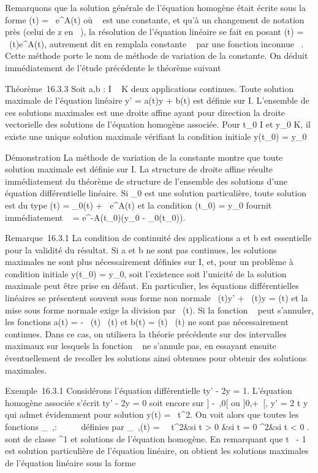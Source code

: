 \documentclass[]{article}
\begin{document}
Remarquons que la solution générale de l'équation homogène était écrite
sous la forme \phi(t) = \lambda~e^A(t) où \lambda~ est une constante, et qu'à
un changement de notation près (celui de z en \lambda~), la résolution de
l'équation linéaire se fait en posant \phi(t) = \lambda~(t)e^A(t),
autrement dit en rempla\ccant la constante \lambda~ par une
fonction inconnue \lambda~. Cette méthode porte le nom de méthode de variation
de la constante. On déduit immédiatement de l'étude précédente le
théorème suivant

Théorème~16.3.3 Soit a,b : I \rightarrow~ K deux applications continues. Toute
solution maximale de l'équation linéaire y' = a(t)y + b(t) est définie
sur I. L'ensemble de ces solutions maximales est une droite affine ayant
pour direction la droite vectorielle des solutions de l'équation
homogène associée. Pour t_0 \in I et y_0 \in K, il existe
une unique solution maximale vérifiant la condition initiale
y(t_0) = y_0

Démonstration La méthode de variation de la constante montre que toute
solution maximale est définie sur I. La structure de droite affine
résulte immédiatement du théorème de structure de l'ensemble des
solutions d'une équation différentielle linéaire. Si \phi_0 est
une solution particulière, toute solution est du type \phi(t) =
\phi_0(t) + \lambda~e^A(t) et la condition \phi(t_0) =
y_0 fournit immédiatement \lambda~ =
e^-A(t_0)(y_0 -
\phi_0(t_0)).

Remarque~16.3.1 La condition de continuité des applications a et b est
essentielle pour la validité du résultat. Si a et b ne sont pas
continues, les solutions maximales ne sont plus nécessairement définies
sur I, et, pour un problème à condition initiale y(t_0) =
y_0, soit l'existence soit l'unicité de la solution maximale
peut être prise en défaut. En particulier, les équations différentielles
linéaires se présentent souvent sous forme non normale \alpha~(t)y' + \beta~(t)y =
\gamma(t) et la mise sous forme normale exige la division par \alpha~(t). Si la
fonction \alpha~ peut s'annuler, les fonctions a(t) = - \beta~(t)
\over \alpha~(t) et b(t) = \gamma(t) \over \alpha~(t)
ne sont pas nécessairement continues. Dans ce cas, on utilisera la
théorie précédente sur des intervalles maximaux sur lesquels la fonction
\alpha~ ne s'annule pas, en essayant ensuite éventuellement de recoller les
solutions ainsi obtenues pour obtenir des solutions maximales.

Exemple~16.3.1 Considérons l'équation différentielle ty' - 2y = 1.
L'équation homogène associée s'écrit ty' - 2y = 0 soit encore sur {]}
-\infty~,0{[} ou {]}0,+\infty~{[}, y' = 2 \over t y qui admet
évidemment pour solution y(t) = \lambda~t^2. On voit alors que
toutes les fonctions \phi_\lambda~,\mu : ~ \rightarrow~ ~ définies par
\phi_\lambda~,\mu(t) = \left \
\cases \lambda~t^2&si t \textgreater{} 0
 &si t = 0 \cr \mut^2&si t
\textless{} 0  \right . sont de classe ^1
et solutions de l'équation homogène. En remarquant que
t\mapsto~ - 1  est
solution particulière de l'équation linéaire, on obtient les solutions
maximales de l'équation linéaire sous la forme
\end{document}
